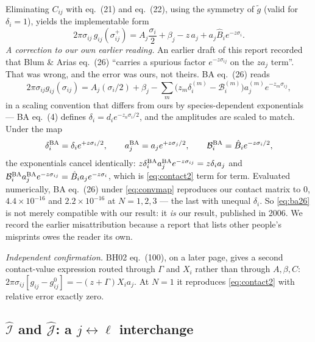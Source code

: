 \documentclass[11pt,a4paper]{article}
\newcommand{\eqBH}[1]{eq.~(#1)}
\begin{document}
Eliminating $C_{ij}$ with \eqBH{21} and \eqBH{22}, using the symmetry of
$\tilde g$ (valid for $\delta_i=1$), yields the implementable form
\begin{equation}
  2\pi\sigma_{ij}\,g_{ij}(\sigma_{ij}^+)=A_j\frac{\sigma_i}{2}+\beta_j
   -z\,a_j+a_j\hat B_i e^{-z\sigma_i}.
  \label{eq:contact2}
\end{equation}
\emph{A correction to our own earlier reading.} An earlier draft of this report
recorded that Blum \& Arias \eqBH{26} ``carries a spurious factor
$e^{-z\sigma_{ij}}$ on the $z a_j$ term''. That was wrong, and the error was
ours, not theirs. BA \eqBH{26} reads
\begin{equation}
  2\pi\sigma_{ij}g_{ij}(\sigma_{ij})=A_j(\sigma_i/2)+\beta_j
   -\sum_{m}\bigl(z_m\delta^{(m)}_i-\mathcal B^{(m)}_i\bigr)a^{(m)}_j
     e^{-z_m\sigma_{ij}},
  \label{eq:ba26}
\end{equation}
in a scaling convention that differs from ours by species-dependent
exponentials --- BA \eqBH{4} defines $\delta_i=d_ie^{-z_n\sigma_i/2}$, and the
amplitudes are scaled to match. Under the map
\begin{equation}
  \delta^{\rm BA}_i=\delta_ie^{+z\sigma_i/2},\qquad
  a^{\rm BA}_j=a_je^{+z\sigma_j/2},\qquad
  \mathcal B^{\rm BA}_i=\hat B_ie^{-z\sigma_i/2},
  \label{eq:convmap}
\end{equation}
the exponentials cancel identically:
$z\delta^{\rm BA}_ia^{\rm BA}_je^{-z\sigma_{ij}}=z\delta_ia_j$ and
$\mathcal B^{\rm BA}_ia^{\rm BA}_je^{-z\sigma_{ij}}=\hat B_ia_je^{-z\sigma_i}$,
which is \eqref{eq:contact2} term for term. Evaluated numerically, BA
\eqBH{26} under \eqref{eq:convmap} reproduces our contact matrix to
$0$, $4.4\times10^{-16}$ and $2.2\times10^{-16}$ at $N=1,2,3$ --- the last with
unequal $\delta_i$. So \eqref{eq:ba26} is not merely compatible with our result:
it \emph{is} our result, published in 2006. We record the earlier misattribution
because a report that lists other people's misprints owes the reader its own.

\emph{Independent confirmation.} BH02 \eqBH{100}, on a later page, gives a
second contact-value expression routed through $\Gamma$ and $X_i$ rather than
through $A,\beta,C$:
$2\pi\sigma_{ij}[g_{ij}-g^0_{ij}]=-(z+\Gamma)X_ia_j$. At $N=1$ it reproduces
\eqref{eq:contact2} with relative error exactly zero.

\subsection{$\hat{\mathcal I}$ and $\hat{\mathcal J}$: a $j\leftrightarrow\ell$ interchange}
\label{sec:IJ}
\end{document}
